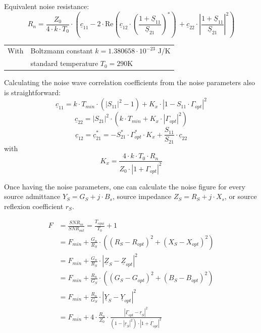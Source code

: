 \documentclass[10pt]{report}
\begin{document}
\addvspace{12pt}

Equivalent noise resistance:
\begin{equation}
R_n = \frac{Z_0}{4\cdot k\cdot T_0}\cdot
      \left( \underline{c}_{11} - 2\cdot
      \text{Re}\left( \underline{c}_{12}\cdot\left( \frac{1+\underline{S}_{11}}{\underline{S}_{21}} \right)^*
      \right)\, + \underline{c}_{22}\cdot
      \left| \frac{1+\underline{S}_{11}}{\underline{S}_{21}} \right|^2 \right)
\label{eqn:nparamRn}
\end{equation}
\begin{tabular}{ll}
With & \quad Boltzmann constant $k = 1.380658\cdot 10^{-23}$ J/K\\
     & \quad standard temperature $T_0 = 290$K\\
\end{tabular}

\addvspace{12pt}

Calculating the noise wave correlation coefficients from the noise parameters
also is straightforward:
\begin{equation}
\underline{c}_{11} = k\cdot T_{min}\cdot (|S_{11}|^2-1) + K_x\cdot |1-S_{11}\cdot\Gamma_{opt}|^2
\end{equation}
\begin{equation}
\underline{c}_{22} = |S_{21}|^2\cdot\left( k\cdot T_{min} + K_x\cdot|\Gamma_{opt}|^2 \right)
\end{equation}
\begin{equation}
\underline{c}_{12} =
\underline{c}_{21}^* = -S_{21}^*\cdot\Gamma_{opt}^*\cdot K_x + \frac{S_{11}}{S_{21}}\cdot\underline{c}_{22}
\end{equation}
with
\begin{equation}
K_x = \frac{4\cdot k\cdot T_0\cdot R_n}{Z_0\cdot|1+\Gamma_{opt}|^2}
\end{equation}


Once having the noise parameters, one can calculate the noise figure for
every source admittance $Y_S=G_S+j\cdot B_s$, source impedance
$Z_S=R_S+j\cdot X_s$, or source reflexion coefficient $r_S$.

\begin{align}
  F & = \frac{SNR_{in}}{SNR_{out}} = \frac{T_{equi}}{T_0} + 1\\
    & = F_{min} + \frac{G_n}{R_S}\cdot\left( (R_S-R_{opt})^2 + (X_S-X_{opt})^2 \right)\\
    & = F_{min} + \frac{G_n}{R_S}\cdot\left| \underline{Z}_S - \underline{Z}_{opt} \right| ^2\\
    & = F_{min} + \frac{R_n}{G_S}\cdot\left( (G_S-G_{opt})^2 + (B_S-B_{opt})^2 \right)\\
    & = F_{min} + \frac{R_n}{G_S}\cdot\left| \underline{Y}_S - \underline{Y}_{opt} \right| ^2\\
    & = F_{min} + 4\cdot\frac{R_n}{Z_0}\cdot\frac{\left| \underline{\Gamma}_{opt}-\underline{r}_S\right| ^2}
                  {\left( 1-|\underline{r}_S|^2\right)\cdot\left| 1+\underline{\Gamma}_{opt}\right| ^2}
\end{align}
\end{document}
